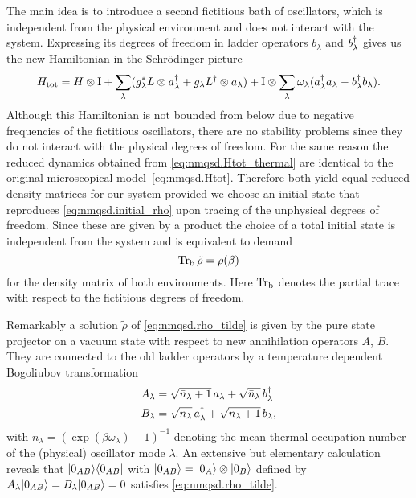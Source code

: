 The main idea is to introduce a second fictitious bath of oscillators, which is independent from the physical environment and does not interact with the system.
Expressing its degrees of freedom in ladder operators $b_\lambda$ and $b^\dagger_\lambda$ gives us the new Hamiltonian in the Schrödinger picture
\begin{equation}
  H_\mathrm{tot} = H \otimes \mathrm{I} + \sum_\lambda ({g}^*_\lambda L\otimes a^\dagger_\lambda + g_\lambda L^\dagger\otimes a_\lambda) + \mathrm{I} \otimes \sum_\lambda \omega_\lambda (a^\dagger_\lambda a_\lambda - b^\dagger_\lambda b_\lambda).
  \label{eq:nmqsd.Htot_thermal}
\end{equation}
Although this Hamiltonian is not bounded from below due to negative frequencies of the fictitious oscillators, there are no stability problems since they do not interact with the physical degrees of freedom.
For the same reason the reduced dynamics obtained from \autoref{eq:nmqsd.Htot_thermal} are identical to the original microscopical model~\ref{eq:nmqsd.Htot}.
Therefore both yield equal reduced density matrices for our system provided we choose an initial state that reproduces \autoref{eq:nmqsd.initial_rho} upon tracing of the unphysical degrees of freedom.
Since these are given by a product the choice of a total initial state is independent from the system and is equivalent to demand
\begin{equation}
  \operatorname{Tr}_\mathrm{b} \tilde\rho = \rho(\beta)
  \label{eq:nmqsd.rho_tilde}
\end{equation}
for the density matrix of both environments.
Here $\operatorname{Tr}_\mathrm{b}$ denotes the partial trace with respect to the fictitious degrees of freedom.

Remarkably a solution $\tilde\rho$ of \autoref{eq:nmqsd.rho_tilde} is given by the pure state projector on a vacuum state with respect to new annihilation operators $A$, $B$.
They are connected to the old ladder operators by a temperature dependent Bogoliubov transformation
\begin{align*}
  A_\lambda &= \sqrt{\bar n_\lambda + 1} \, a_\lambda + \sqrt{\bar n_\lambda} \, b^\dagger_\lambda \\
  B_\lambda &= \sqrt{\bar n_\lambda} \, a^\dagger_\lambda + \sqrt{\bar n_\lambda + 1} \, b_\lambda,
\end{align*}
with $\bar n_\lambda = \left( \exp(\beta \omega_\lambda) - 1 \right)^{-1}$ denoting the mean thermal occupation number of the (physical) oscillator mode $\lambda$.
An extensive but elementary calculation reveals that $| 0_{AB} \rangle\langle 0_{AB} |$ with $| 0_{AB} \rangle = | 0_A \rangle \otimes | 0_B \rangle$ defined by $A_\lambda| 0_{AB} \rangle = B_\lambda| 0_{AB} \rangle = 0$ satisfies \autoref{eq:nmqsd.rho_tilde}.

